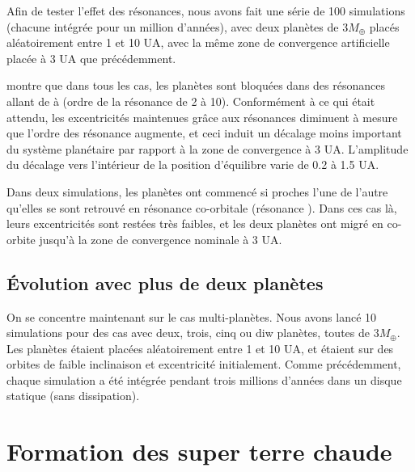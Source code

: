 Afin de tester l'effet des résonances, nous avons fait une série de 100 simulations (chacune intégrée pour un million d'années), avec deux planètes de $3\unit{M_\oplus}$ placés aléatoirement entre 1 et 10 UA, avec la même zone de convergence artificielle placée à 3 UA que précédemment. 

 montre que dans tous les cas, les planètes sont bloquées dans des résonances allant de  à  (ordre de la résonance de 2 à 10). Conformément à ce qui était attendu, les excentricités maintenues grâce aux résonances diminuent à mesure que l'ordre des résonance augmente, et ceci induit un décalage moins important du système planétaire par rapport à la zone de convergence à 3 UA. L'amplitude du décalage vers l'intérieur de la position d'équilibre varie de 0.2 à 1.5 UA. 

Dans deux simulations, les planètes ont commencé si proches l'une de l'autre qu'elles se sont retrouvé en résonance co-orbitale (résonance ). Dans ces cas là, leurs excentricités sont restées très faibles, et les deux planètes ont migré en co-orbite jusqu'à la zone de convergence nominale à 3 UA. 

\subsection{Évolution avec plus de deux planètes}
On se concentre maintenant sur le cas multi-planètes. Nous avons lancé 10 simulations pour des cas avec deux, trois, cinq ou diw planètes, toutes de $3\unit{M_\oplus}$. Les planètes étaient placées aléatoirement entre 1 et 10 UA, et étaient sur des orbites de faible inclinaison et excentricité initialement. Comme précédemment, chaque simulation a été intégrée pendant trois millions d'années dans un disque statique (sans dissipation). 

\bigskip



\section{Formation des super terre chaude}
%
%


